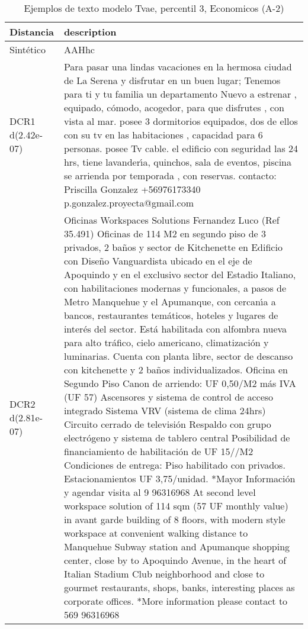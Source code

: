 \begin{table}[H]
\centering
\fontsize{10}{14}\selectfont
\caption{Ejemplos de texto modelo Tvae, percentil 3, Economicos (A-2)}
\label{table-example-economicos-a-2-tvae-3p-text}
\begin{tabular}{|l|m{35em}|}
\hline
\rowcolor[gray]{0.8}
Distancia & description \\
\hline Sintético & AAHhc \\
\hline DCR1 d(2.42e-07) & Para pasar una lindas vacaciones en la hermosa ciudad de La Serena y disfrutar en un buen lugar; Tenemos para ti y tu familia un departamento Nuevo a estrenar , equipado, c\'omodo, acogedor, para que disfrutes , con vista al mar. posee 3 dormitorios equipados, dos de ellos con su tv en las habitaciones , capacidad para 6 personas.
 posee Tv cable. el edificio con seguridad las 24 hrs, tiene lavander{\'\i}a, quinchos, sala de eventos, piscina se arrienda por temporada , con reservas. contacto: Priscilla Gonzalez  +56976173340 p.gonzalez.proyecta@gmail.com \\
\hline DCR2 d(2.81e-07) & Oficinas Workspaces Solutions Fernandez Luco (Ref 35.491) Oficinas de 114 M2 en segundo piso de 3 privados, 2 ba\~nos y sector de Kitchenette en Edificio con Dise\~no Vanguardista ubicado en el eje de Apoquindo y en el exclusivo sector del Estadio Italiano, con habilitaciones modernas y funcionales, a pasos de Metro Manquehue y el Apumanque, con cercan{\'\i}a a bancos, restaurantes tem\'aticos, hoteles y lugares de inter\'es del sector. Est\'a habilitada con alfombra nueva para alto tr\'afico, cielo americano, climatizaci\'on y luminarias. Cuenta con planta libre, sector de descanso con kitchenette y 2 ba\~nos individualizados. Oficina en Segundo Piso   Canon de arriendo: UF 0,50/M2 m\'as IVA (UF 57)   Ascensores y sistema de control de acceso integrado   Sistema VRV (sistema de clima 24hrs)   Circuito cerrado de televisi\'on   Respaldo con grupo electr\'ogeno y sistema de tablero central    Posibilidad de financiamiento de habilitaci\'on de UF 15//M2    Condiciones de entrega: Piso habilitado con privados.   Estacionamientos UF 3,75/unidad.  *Mayor Informaci\'on y agendar visita al 9 96316968 At second level workspace solution of 114 sqm (57 UF monthly value) in avant garde building of 8 floors, with modern style workspace at convenient walking distance to Manquehue Subway station and Apumanque shopping center, close by to Apoquindo Avenue, in the heart of Italian Stadium Club neighborhood and close to gourmet restaurants, shops, banks, interesting places as corporate offices. *More information please contact to 569 96316968 \\
\hline
\end{tabular}
\end{table}

